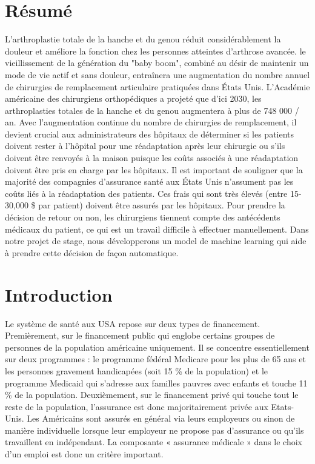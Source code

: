 \documentclass[12pt, french]{article}
\begin{document}
\newpage

\listoffigures

\newpage

\listoftables

\newpage

\section*{Résumé}
L'arthroplastie totale de la hanche et du genou réduit considérablement la douleur
et améliore la fonction chez les personnes atteintes d'arthrose avancée. le
vieillissement de la génération du "baby boom", combiné au désir de
maintenir un mode de vie actif et sans douleur, entraînera une augmentation
du nombre annuel de chirurgies de remplacement articulaire pratiquées dans
États Unis. L'Académie américaine des chirurgiens orthopédiques a
projeté que d'ici 2030, les arthroplasties totales de la hanche et du genou
augmentera à plus de 748 000 / an. 
Avec l'augmentation continue du nombre de chirurgies de remplacement, il devient crucial aux administrateurs des hôpitaux de déterminer si les patients doivent rester à l'hôpital pour une réadaptation après leur 	chirurgie ou s'ils doivent être renvoyés à la maison puisque les coûts associés à une réadaptation doivent être pris en charge par les hôpitaux. Il est important de souligner que la majorité des compagnies d'assurance santé aux États Unis n'assument pas les coûts liés à la réadaptation des patients. Ces frais qui sont très élevés (entre 15-30,000 \$ par patient) doivent être assurés par les hôpitaux. Pour prendre la décision de retour ou non, les chirurgiens tiennent compte des antécédents médicaux du patient, ce qui est un travail difficile à effectuer manuellement. Dans notre projet de stage, nous développerons un model de machine learning qui aide à prendre cette décision de façon automatique.
   	
\newpage
\section{Introduction}	
	
Le système de santé aux USA repose sur deux types de financement. Premièrement, sur le financement public qui englobe certains groupes de personnes de la population américaine uniquement. Il se concentre 	essentiellement sur deux programmes : le programme 		fédéral Medicare pour les plus de 65 ans et les personnes gravement handicapées (soit 15 \% de la population) et le programme Medicaid qui 			s’adresse aux familles pauvres avec enfants et touche 11 \% de la population. Deuxièmement, sur le financement privé qui touche tout le reste de la population, l’assurance est donc majoritairement privée aux 		Etats-Unis. Les Américains sont assurés en général via leurs employeurs ou sinon de manière individuelle lorsque leur employeur ne propose pas d’assurance ou qu’ils travaillent en indépendant. La composante « 	assurance médicale » dans le choix d’un emploi est donc un critère important.\\
	
\end{document}
